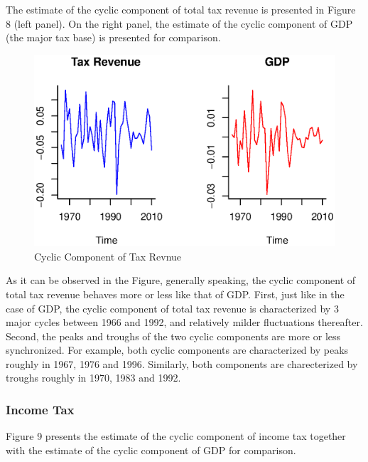 \documentclass[12pt,a4paper,final]{article}
\begin{document}
The estimate of the cyclic component of total tax revenue is presented in Figure 8 (left panel). On the right panel, the estimate of the cyclic component of GDP (the major tax base) is presented for comparison.

\begin{figure}[ht]
\centering
\begin{small}
\caption{Cyclic Component of Tax Revnue}
\end{small}
\includegraphics[scale=0.601]{tax_revenue.eps} 
\end{figure}

As it can be observed in the Figure, generally speaking, the cyclic component of total tax revenue behaves more or less like that of GDP.  First, just like in the case of GDP, the cyclic component of total tax revenue is characterized by 3 major cycles between 1966 and 1992, and relatively milder fluctuations thereafter. Second, the peaks and troughs of the two cyclic components are more or less synchronized. For example, both cyclic components are characterized by peaks roughly in 1967, 1976 and 1996.  Similarly, both components are charecterized by troughs roughly in 1970, 1983 and 1992.

\newpage
\subsubsection{Income Tax}

Figure 9 presents the estimate of the cyclic component of income tax together with the estimate of the cyclic component of GDP for comparison.
\end{document}
